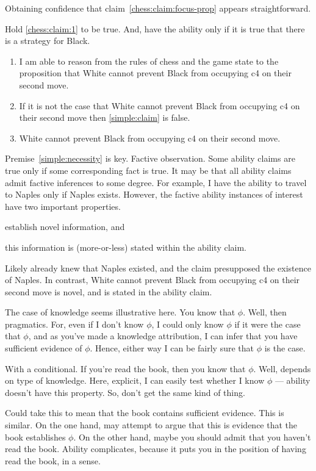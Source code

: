 \documentclass[10pt]{article}
\begin{document}
Obtaining confidence that claim~\ref{chess:claim:focus-prop} appears straightforward.

Hold \ref{chess:claim:1} to be true.
And, have the ability only if it is true that there is a strategy for Black.

\begin{enumerate}
\item\label{simple:claim} I am able to reason from the rules of chess and the game state to the proposition that White cannot prevent Black from occupying c4 on their second move.
\item\label{simple:necessity} If it is not the case that White cannot prevent Black from occupying c4 on their second move then \ref{simple:claim} is false.
\item\label{simple:focus} White cannot prevent Black from occupying c4 on their second move.
\end{enumerate}

Premise~\ref{simple:necessity} is key.
Factive observation.
Some ability claims are true only if some corresponding fact is true.
It may be that all ability claims admit factive inferences to some degree.
For example, I have the ability to travel to Naples only if Naples exists.
However, the factive ability instances of interest have two important properties.
\begin{enumerate*}
\item establish novel information, and
\item this information is (more-or-less) stated within the ability claim.
\end{enumerate*}
Likely already knew that Naples existed, and the claim presupposed the existence of Naples.
In contrast, White cannot prevent Black from occupying c4 on their second move is novel, and is stated in the ability claim.

\begin{note}
  The case of knowledge seems illustrative here.
  You know that \(\phi\).
  Well, then pragmatics.
  For, even if I don't know \(\phi\), I could only know \(\phi\) if it were the case that \(\phi\), and as you've made a knowledge attribution, I can infer that you have sufficient evidence of \(\phi\).
  Hence, either way I can be fairly sure that \(\phi\) is the case.

  With a conditional.
  If you're read the book, then you know that \(\phi\).
  Well, depends on type of knowledge.
  Here, explicit, I can easily test whether I know \(\phi\) --- ability doesn't have this property.
  So, don't get the same kind of thing.

  Could take this to mean that the book contains sufficient evidence.
  This is similar.
  On the one hand, may attempt to argue that this is evidence that the book establishes \(\phi\).
  On the other hand, maybe you should admit that you haven't read the book.
  Ability complicates, because it puts you in the position of having read the book, in a sense.
\end{note}
\end{document}
